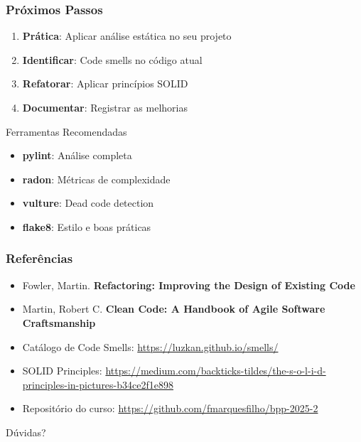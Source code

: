 \documentclass[aspectratio=169]{beamer}
\begin{document}
\begin{frame}
\frametitle{Próximos Passos}
\begin{enumerate}
    \item \textbf{Prática}: Aplicar análise estática no seu projeto
    \item \textbf{Identificar}: Code smells no código atual
    \item \textbf{Refatorar}: Aplicar princípios SOLID
    \item \textbf{Documentar}: Registrar as melhorias
\end{enumerate}

\vspace{0.5cm}
\begin{block}{Ferramentas Recomendadas}
\footnotesize
\begin{itemize}
    \item \textbf{pylint}: Análise completa
    \item \textbf{radon}: Métricas de complexidade
    \item \textbf{vulture}: Dead code detection
    \item \textbf{flake8}: Estilo e boas práticas
\end{itemize}
\end{block}
\end{frame}

\begin{frame}
\frametitle{Referências}
\footnotesize
\begin{itemize}
    \item Fowler, Martin. \textbf{Refactoring: Improving the Design of Existing Code}
    \item Martin, Robert C. \textbf{Clean Code: A Handbook of Agile Software Craftsmanship}
    \item Catálogo de Code Smells: \url{https://luzkan.github.io/smells/}
    \item SOLID Principles: \url{https://medium.com/backticks-tildes/the-s-o-l-i-d-principles-in-pictures-b34ce2f1e898}
    \item Repositório do curso: \url{https://github.com/fmarquesfilho/bpp-2025-2}
\end{itemize}

\vspace{0.5cm}
\begin{center}
\Large
Dúvidas?
\end{center}
\end{frame}
\end{document}
